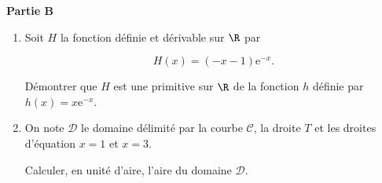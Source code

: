 \documentclass{cornouaille}
\begin{document}
\begin{exercice}
\bigskip

\textbf{Partie B}

\medskip
 
\begin{enumerate}
\item Soit $H$ la fonction définie et dérivable sur $\R$ par 

\[H(x) = (- x - 1)\text{e}^{- x}.\]
 
Démontrer que $H$ est une primitive sur $\R$ de la fonction $h$ définie par $h(x) = x\text{e}^{- x}$. 
\item On note $\mathcal{D}$ le domaine délimité par la courbe $\mathcal{C}$, la droite $T$ et les droites d'équation $x = 1$ et $x = 3$.
 
Calculer, en unité d'aire, l'aire du domaine $\mathcal{D}$. 
\end{enumerate}
\end{exercice}
\end{document}
